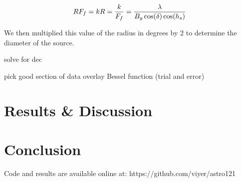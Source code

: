 \documentclass{article}
\begin{document}
  \[RF_{f}=k \\
      R = \frac{k}{F_{f}} = \frac{\lambda}{B_{y}\cos(\delta)\cos(h_{s})}
  \]

  We then multiplied this value of the radius in degrees by 2 to determine the
  diameter of the source.



  solve for dec

  pick good section of data
  overlay Bessel function (trial and error)


\section{Results \& Discussion}

\section{Conclusion}

Code and results are available online at: https://github.com/viyer/astro121

%   
%   
\end{document}
